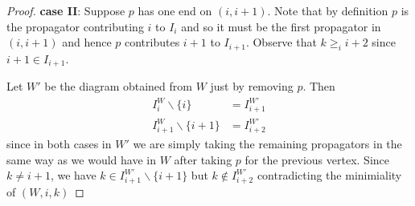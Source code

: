 \documentclass[11pt]{article}
\theoremstyle{remark}
\theoremstyle{definition}
\begin{document}
\begin{proof}
\textbf{case II}: Suppose $p$ has one end on $(i, i+1)$.  Note that by definition $p$ is the propagator contributing $i$ to $I_i$ and so it must be the first propagator in $(i, i+1)$ and hence $p$ contributes $i+1$ to $I_{i+1}$.  Observe that $k\geq_i i+2$ since $i+1\in I_{i+1}$.

Let $W'$ be the diagram obtained from $W$ just by removing $p$.  Then
\begin{align*}
  I_i^W \backslash \{i\} & = I_{i+1}^{W'} \\
  I_{i+1}^W \backslash \{i+1\} & = I_{i+2}^{W'}
\end{align*}
since in both cases in $W'$ we are simply taking the remaining propagators in the same way as we would have in $W$ after taking $p$ for the previous vertex.  Since $k \neq i+1$, we have $k\in I_{i+1}^{W'}\backslash\{i+1\}$ but $k\not\in I_{i+2}^{W'}$ contradicting the minimiality of $(W, i, k)$


\end{proof}
\end{document}
